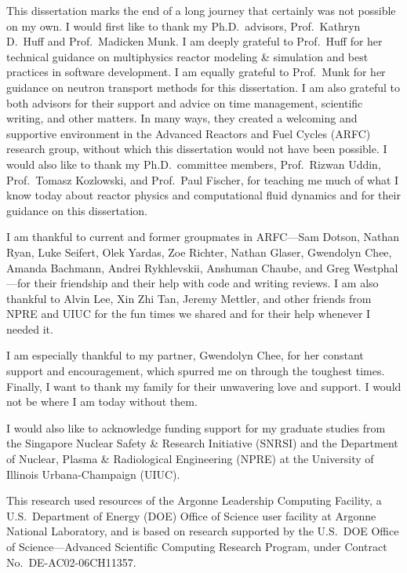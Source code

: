 This dissertation marks the end of a long journey that certainly was not possible on my own.
I would first like to thank my Ph.D.\ advisors, Prof.\ Kathryn D.\ Huff and Prof.\ Madicken Munk. I
am deeply grateful to Prof.\ Huff for her technical guidance on multiphysics reactor modeling \&
simulation and best practices in software development. I am equally grateful to Prof.\ Munk for her
guidance on neutron transport methods for
this dissertation. I am also grateful to both advisors for their support and advice on time
management, scientific writing, and other matters. In many ways, they created a welcoming
and supportive environment in the Advanced Reactors and Fuel Cycles (ARFC)
research group, without which this dissertation would not have been possible. I would also like to
thank my Ph.D.\ committee members, Prof.\ Rizwan Uddin, Prof.\ Tomasz Kozlowski, and Prof.\ Paul
Fischer, for teaching me much of what I know today about reactor physics and computational fluid
dynamics and for their guidance on this dissertation.

I am thankful to current and former groupmates in ARFC---Sam Dotson, Nathan Ryan, Luke Seifert,
Olek Yardas, Zoe Richter, Nathan Glaser, Gwendolyn Chee, Amanda Bachmann,
Andrei Rykhlevskii, Anshuman Chaube, and Greg Westphal---for their friendship and their help with
code and writing reviews. I am also thankful to
Alvin Lee, Xin Zhi Tan, Jeremy Mettler, and other friends from NPRE and UIUC
for the fun times we shared and for their help whenever I needed it.

I am especially thankful to my partner, Gwendolyn Chee, for her constant support and encouragement,
which spurred me on through the toughest times.
Finally, I want to thank my family for their unwavering love and support. I would not be where I am
today without them.

I would also like to acknowledge funding support for my graduate studies from the Singapore
Nuclear Safety \& Research Initiative (SNRSI) and the Department of Nuclear, Plasma \& Radiological
Engineering (NPRE) at the University of Illinois Urbana-Champaign (UIUC).

This research used resources of the Argonne Leadership Computing Facility, a U.S.\ Department of
Energy (DOE) Office of Science user facility at Argonne National Laboratory, and is based on
research supported by the U.S.\ DOE Office of Science---Advanced Scientific Computing Research
Program, under Contract No.\ DE-AC02-06CH11357.
